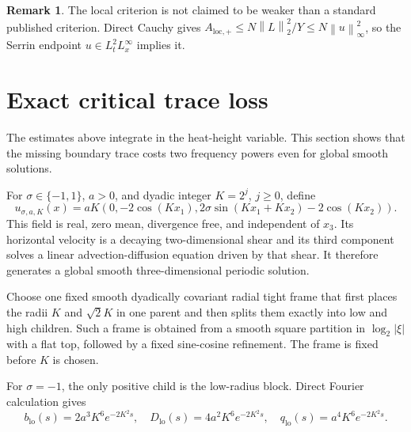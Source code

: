 \documentclass[11pt]{article}
\theoremstyle{definition}
\newtheorem{remark}[theorem]{Remark}
\newcommand{\norm}[1]{\left\lVert #1\right\rVert}
\newcommand{\abs}[1]{\left\lvert #1\right\rvert}
\begin{document}
\begin{remark}
The local criterion is not claimed to be weaker than a standard published
criterion.  Direct Cauchy gives
\(A_{\mathrm{loc},+}\le N\norm{L}_2^2/Y
\le N\norm{u}_\infty^2\), so the Serrin endpoint
\(u\in L_t^2L_x^\infty\) implies it.
\end{remark}

\section{Exact critical trace loss}\label{sec:trace}

The estimates above integrate in the heat-height variable.  This section
shows that the missing boundary trace costs two frequency powers even for
global smooth solutions.

For \(\sigma\in\{-1,1\}\), \(a>0\), and dyadic integer
\(K=2^j\), \(j\ge0\), define
\begin{equation}\label{eq:2d3c}
 u_{\sigma,a,K}(x)=aK
 \left(0,-2\cos(Kx_1),
 2\sigma\sin(Kx_1+Kx_2)-2\cos(Kx_2)\right).
\end{equation}
This field is real, zero mean, divergence free, and independent of \(x_3\).
Its horizontal velocity is a decaying two-dimensional shear and its third
component solves a linear advection-diffusion equation driven by that shear.
It therefore generates a global smooth three-dimensional periodic solution.

Choose one fixed smooth dyadically covariant radial tight frame that first
places the radii \(K\) and \(\sqrt2K\) in one parent and then splits them
exactly into low and high children.  Such a frame is obtained from a smooth
square partition in \(\log_2\abs{\xi}\) with a flat top, followed by a fixed
sine-cosine refinement.  The frame is fixed before \(K\) is chosen.

For \(\sigma=-1\), the only positive child is the low-radius block.  Direct
Fourier calculation gives
\begin{equation}\label{eq:low-block}
 b_{\mathrm{lo}}(s)=2a^3K^6e^{-2K^2s},
 \quad
 D_{\mathrm{lo}}(s)=4a^2K^6e^{-2K^2s},
 \quad
 q_{\mathrm{lo}}(s)=a^4K^6e^{-2K^2s}.
\end{equation}
\end{document}
